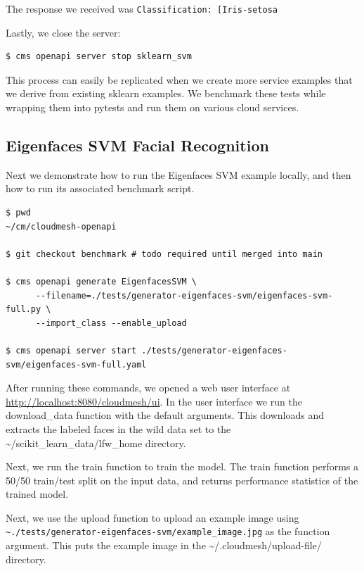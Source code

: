 The response we received was
\texttt{Classification:\ {[}\textquotesingle{}Iris-setosa\textquotesingle{}{]}}

Lastly, we close the server:

\begin{verbatim}
$ cms openapi server stop sklearn_svm
\end{verbatim}

This process can easily be replicated when we create more service
examples that we derive from existing sklearn examples. We benchmark
these tests while wrapping them into pytests and run them on various
cloud services.

\subsection{Eigenfaces SVM Facial
Recognition}\label{a.3.-eigenfaces-svm-facial-recognition}

Next we demonstrate how to run the Eigenfaces SVM example locally, and
then how to run its associated benchmark script.

\begin{verbatim}
$ pwd
~/cm/cloudmesh-openapi

$ git checkout benchmark # todo required until merged into main

$ cms openapi generate EigenfacesSVM \
      --filename=./tests/generator-eigenfaces-svm/eigenfaces-svm-full.py \
      --import_class --enable_upload

$ cms openapi server start ./tests/generator-eigenfaces-svm/eigenfaces-svm-full.yaml
\end{verbatim}

After running these commands, we opened a web user interface at
\url{http://localhost:8080/cloudmesh/ui}. In the user interface we run
the download\_data function with the default arguments. This downloads
and extracts the labeled faces in the wild data set to the
\textasciitilde/scikit\_learn\_data/lfw\_home directory.

Next, we run the train function to train the model. The train function
performs a 50/50 train/test split on the input data, and returns
performance statistics of the trained model.

Next, we use the upload function to upload an example image using
\texttt{\textasciitilde{}./tests/generator-eigenfaces-svm/example\_image.jpg}
as the function argument. This puts the example image in the
\textasciitilde/.cloudmesh/upload-file/ directory.

